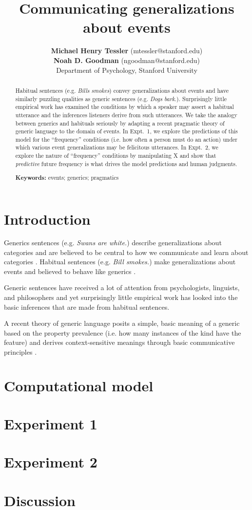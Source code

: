 \documentclass[10pt,letterpaper]{article}
\title{Communicating generalizations about events}
\author{{\large \bf Michael Henry Tessler} (mtessler@stanford.edu) \\ {\large \bf Noah D. Goodman} (ngoodman@stanford.edu) \\
  Department of Psychology, Stanford University}
\begin{document}
\maketitle


\begin{abstract}
Habitual sentences (e.g. \emph{Bills smokes}) convey generalizations about events and have similarly puzzling qualities as generic sentences (e.g. \emph{Dogs bark.}). 
Surprisingly little empirical work has examined the conditions by which a speaker may assert a habitual utterance and the inferences listeners derive from such utterances.
We take the analogy between generics and habituals seriously by adapting a recent pragmatic theory of generic language to the domain of events.
In Expt.~1, we explore the predictions of this model for the ``frequency'' conditions (i.e. how often a person must do an action) under which various event generalizations may be felicitous utterances. 
In Expt.~2, we explore the nature of ``frequency'' conditions by manipulating X and show that \emph{predictive} future frequency is what drives the model predictions and human judgments. 

\textbf{Keywords:} 
events; generics; pragmatics
\end{abstract}

\section{Introduction}

Generics sentences (e.g. \emph{Swans are white.}) describe generalizations about categories and are believed to be central to how we communicate and learn about categories \cite{Carlson1977, Gelman2004}.
Habitual sentences (e.g. \emph{Bill smokes.}) make generalizations about events and believed to behave like generics \cite{Carlson2005}.

Generic sentences have received a lot of attention from psychologists, linguists, and philosophers and yet surprisingly little empirical work has looked into the basic inferences that are made from habitual sentences.

A recent theory of generic language posits a simple, basic meaning of a generic based on the property prevalence (i.e. how many instances of the kind have the feature) and derives context-sensitive meanings through basic communicative principles \cite{TesslerUnderReview}.

\section{Computational model}

\section{Experiment 1}

\section{Experiment 2}

\section{Discussion}



\setlength{\bibleftmargin}{.125in}
\setlength{\bibindent}{-\bibleftmargin}


\end{document}
